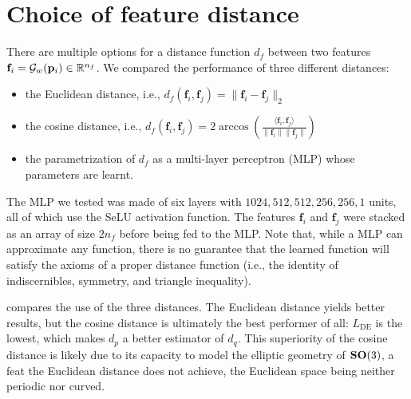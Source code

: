\section{Choice of feature distance}\label{apx:feature-distance}


There are multiple options for a distance function $d_f$ between two features $\mathbf{f}_i = \mathcal{G}_w(\mathbf{p}_i) \in \mathbb{R}^{n_f}$. We compared the performance of three different distances: 

\begin{itemize}
    \item the Euclidean distance, i.e., $d_f(\mathbf{f}_i, \mathbf{f}_j) = \| \mathbf{f}_i - \mathbf{f}_j \|_2$
    \item the cosine distance, i.e.,
$ d_f(\mathbf{f}_i,\mathbf{f}_j) = 2 \arccos \left( \frac{\langle \mathbf{f}_i, \mathbf{f}_j \rangle}{\lVert \mathbf{f}_i \rVert \lVert \mathbf{f}_j \rVert} \right)$
    \item the parametrization of $d_f$ as a multi-layer perceptron (MLP) whose parameters are learnt. 
\end{itemize}

The MLP we tested was made of six layers with $1024, 512, 512, 256, 256, 1$ units, all of which use the SeLU activation function. The features $\mathbf{f}_i$ and $\mathbf{f}_j$ were stacked as an array of size $2n_f$ before being fed to the MLP. Note that, while a MLP can approximate any function, there is no guarantee that the learned function will satisfy the axioms of a proper distance function (i.e., the identity of indiscernibles, symmetry, and triangle inequality).

 compares the use of the three distances.  The Euclidean distance yields better results, but the cosine distance is ultimately the best performer of all: $L_\text{DE}$ is the lowest, which makes $d_p$ a better estimator of $d_q$.
This superiority of the cosine distance is likely due to its capacity to model the elliptic geometry of $\mathrm{\mathbf{SO}}(3)$, a feat the Euclidean distance does not achieve, the Euclidean space being neither periodic nor curved.

